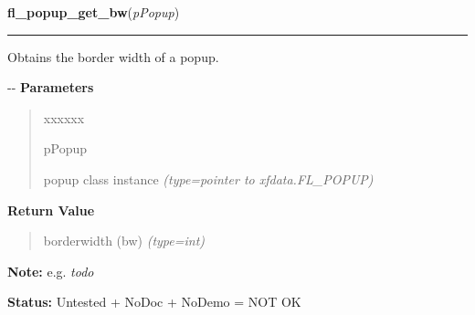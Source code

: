     \label{xformslib:flpopup:fl_popup_get_bw}

    \vspace{0.5ex}

\hspace{.8\funcindent}\begin{boxedminipage}{\funcwidth}

    \raggedright \textbf{fl\_popup\_get\_bw}(\textit{pPopup})

    \vspace{-1.5ex}

    \rule{\textwidth}{0.5\fboxrule}
\setlength{\parskip}{2ex}

Obtains the border width of a popup.

-{}-
\setlength{\parskip}{1ex}
      \textbf{Parameters}
      \vspace{-1ex}

      \begin{quote}
        \begin{Ventry}{xxxxxx}

          \item[pPopup]


popup class instance
            {\it (type=pointer to xfdata.FL\_POPUP)}

        \end{Ventry}

      \end{quote}

      \textbf{Return Value}
    \vspace{-1ex}

      \begin{quote}

borderwidth (bw)
      {\it (type=int)}

      \end{quote}

\textbf{Note:} 
e.g. \emph{todo}


\textbf{Status:} 
Untested + NoDoc + NoDemo = NOT OK


    \end{boxedminipage}

    \label{xformslib:flpopup:fl_popup_set_bw}

    \vspace{0.5ex}

